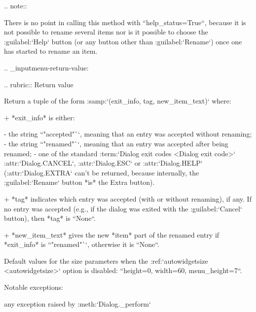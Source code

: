 \begin{DoxyVerb}
.. note::

  There is no point in calling this method with
  ``help_status=True``, because it is not possible to rename
  several items nor is it possible to choose the
  :guilabel:`Help` button (or any button other than
  :guilabel:`Rename`) once one has started to rename an item.

.. _inputmenu-return-value:

.. rubric:: Return value

Return a tuple of the form :samp:`({exit_info}, {tag},
{new_item_text})` where:

  + *exit_info* is either:

    - the string ``"accepted"``, meaning that an entry was
      accepted without renaming;
    - the string ``"renamed"``, meaning that an entry was
      accepted after being renamed;
    - one of the standard :term:`Dialog exit codes <Dialog exit
      code>` :attr:`Dialog.CANCEL`, :attr:`Dialog.ESC` or
      :attr:`Dialog.HELP` (:attr:`Dialog.EXTRA` can't be
      returned, because internally, the :guilabel:`Rename`
      button *is* the Extra button).

  + *tag* indicates which entry was accepted (with or without
    renaming), if any. If no entry was accepted (e.g., if the
    dialog was exited with the :guilabel:`Cancel` button), then
    *tag* is ``None``.

  + *new_item_text* gives the new *item* part of the renamed
    entry if *exit_info* is ``"renamed"``, otherwise it is
    ``None``.

Default values for the size parameters when the
:ref:`autowidgetsize <autowidgetsize>` option is disabled:
``height=0, width=60, menu_height=7``.

Notable exceptions:

  any exception raised by :meth:`Dialog._perform`\end{DoxyVerb}
